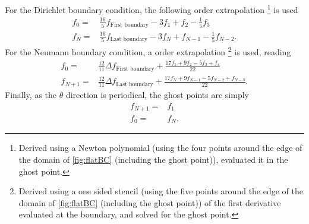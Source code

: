 For the Dirichlet boundary condition, the following  order extrapolation %
%
\footnote{
    Derived using a Newton polynomial (using the four points around the edge of the domain of \cref{fig:flatBC} (including the ghost point)), evaluated it in the ghost point.
}%
is used
%
\begin{align*}
      f_{0} =& \frac{16}{5}f_{\text{First boundary}}
              - 3          f_1
              +            f_2
              - \frac{1}{5}f_3
    \\
      f_{N} =& \frac{16}{5}f_{\text{Last boundary}}
              - 3          f_{N}
              +            f_{N-1}
              - \frac{1}{5}f_{N-2}.
\end{align*}
%
For the Neumann boundary condition, a  order extrapolation %
%
\footnote{
    Derived using a one sided stencil (using the five points around the edge of the domain of \cref{fig:flatBC} (including the ghost point)) of the first derivative evaluated at the boundary, and solved for the ghost point.
}%
%
is used, reading
%
\begin{align*}
      f_0 =& \frac{12}{11}\Delta f_{\text{First boundary}}
                +
                \frac{
                  17f_1
                +  9f_2
                -  5f_3
                +   f_4
               }{22}
    \\
      f_{N+1} =& \frac{12}{11}\Delta f_{\text{Last boundary}}
                +
                \frac{
                  17f_{N}
                +  9f_{N-1}
                -  5f_{N-2}
                +   f_{N-3}
               }{22}.
\end{align*}
%
Finally, as the $\theta$ direction is periodical, the ghost points are simply
%
\begin{align*}
    f_{N+1} =& f_{1}
    \\
    f_{0} =& f_{N}.
\end{align*}
